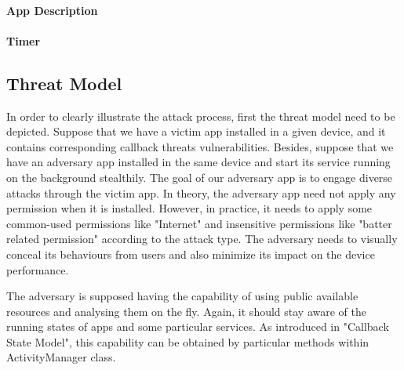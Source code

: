 \documentclass{sig-alternate-05-2015}
\begin{document}
\paragraph{App Description}
\paragraph{Timer}

\subsection{Threat Model}
In order to clearly illustrate the attack process, first the threat model need to be depicted.
Suppose that we have a victim app installed in a given device, and it contains corresponding callback threats vulnerabilities. Besides, suppose that we have an adversary app installed in the same device and start its service running on the background stealthily. The goal of our adversary app is to engage diverse attacks through the victim app. In theory, the adversary app need not apply any permission when it is installed. However, in practice, it needs to apply some  common-used permissions like "Internet" and insensitive permissions like "batter related permission" according to the attack type. The adversary needs to visually conceal its behaviours from users and also minimize its impact on the device performance. 

The adversary is supposed having the capability of using public available resources and analysing them on the fly. Again, it should stay aware of the running states of apps and some particular services. As introduced in "Callback State Model", this capability can be obtained by particular methods within ActivityManager class.
\end{document}
